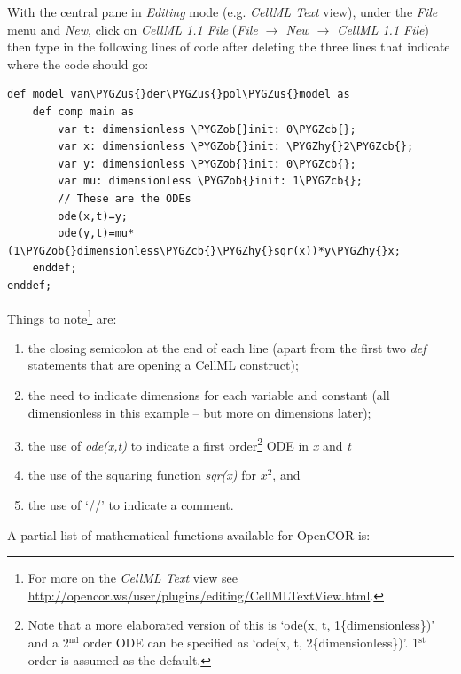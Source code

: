 \documentclass[a4paper,10pt,english]{sphinxmanual}
\def\PYGZus{\char`\_}
\def\PYGZob{\char`\{}
\def\PYGZcb{\char`\}}
\def\PYGZhy{\char`\-}
\begin{document}
With the central pane in \emph{Editing} mode (e.g. \emph{CellML Text} view), under
the \emph{File} menu and \emph{New}, click on \emph{CellML 1.1 File} (\emph{File \(\rightarrow\) New \(\rightarrow\) CellML 1.1 File}) then type in the
following lines of code after deleting the three lines that indicate
where the code should go:

\begin{Verbatim}[commandchars=\\\{\}]
def model van\PYGZus{}der\PYGZus{}pol\PYGZus{}model as
    def comp main as
        var t: dimensionless \PYGZob{}init: 0\PYGZcb{};
        var x: dimensionless \PYGZob{}init: \PYGZhy{}2\PYGZcb{};
        var y: dimensionless \PYGZob{}init: 0\PYGZcb{};
        var mu: dimensionless \PYGZob{}init: 1\PYGZcb{};
        // These are the ODEs
        ode(x,t)=y;
        ode(y,t)=mu*(1\PYGZob{}dimensionless\PYGZcb{}\PYGZhy{}sqr(x))*y\PYGZhy{}x;
    enddef;
enddef;
\end{Verbatim}

Things to note\footnote[3]{
For more on the \emph{CellML Text} view see \href{http://opencor.ws/user/plugins/editing/CellMLTextView.html}{http://opencor.ws/user/plugins/editing/CellMLTextView.html}.
} are:
\begin{enumerate}
\item {} 
the closing semicolon at the end of each line (apart from the first two \emph{def} statements that are opening a CellML construct);

\item {} 
the need to indicate dimensions for each variable and constant (all dimensionless in this example – but more on dimensions later);

\item {} 
the use of \emph{ode(x,t)} to indicate a first order\footnote[4]{
Note that a more elaborated version of this is ‘ode(x, t, 1\{dimensionless\})’ and a 2$^{\text{nd}}$ order ODE can be specified as ‘ode(x, t, 2\{dimensionless\})’. 1$^{\text{st}}$ order is assumed as the default.
} ODE in \emph{x} and \emph{t}

\item {} 
the use of the squaring function \emph{sqr(x)} for \(x^{2}\), and

\item {} 
the use of ‘//’ to indicate a comment.

\end{enumerate}

A partial list of mathematical functions available for OpenCOR is:
\end{document}
